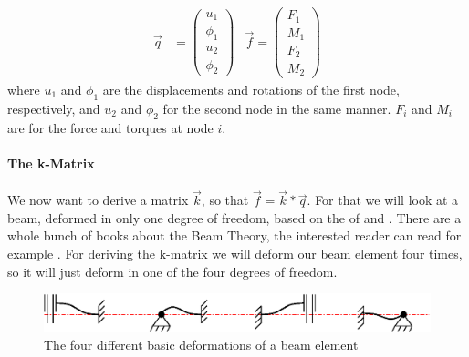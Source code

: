 \begin{align}
\vec{q}&=\left(\begin{array}{c}
u_1 \\ 
\phi_1 \\ 
u_2 \\ 
\phi_2
\end{array} \right)&\vec{f}=\left(\begin{array}{c}
F_1 \\ 
M_1 \\ 
F_2 \\ 
M_2
\end{array}\right)\nonumber
\end{align}
where $u_1$ and $\phi_1$ are the displacements and rotations of the first node, respectively, and  $u_2$ and $\phi_2$ for the second node in the same manner. $F_i$ and $M_i$ are for the force and torques at node $i$.
\bigskip 
\paragraph{The k-Matrix}

We now want to derive a matrix $\vec{k}$, so that $\vec{f}=\vec{k}*\vec{q}$. For that we will look at a beam, deformed in only one degree of freedom, based on the  of  and . There are a whole bunch of books about the Beam Theory, the interested reader can read for example \cite{timoschenko}. For deriving the k-matrix we will deform our beam element four times, so it will just deform in one of the four degrees of freedom.\\
\bigskip
\begin{figure}
\begin{center}
\includegraphics[scale=1.2]{fourDeformations}
\caption{The four different basic deformations of a beam element}
\end{center}
\end{figure}
\bigskip 

